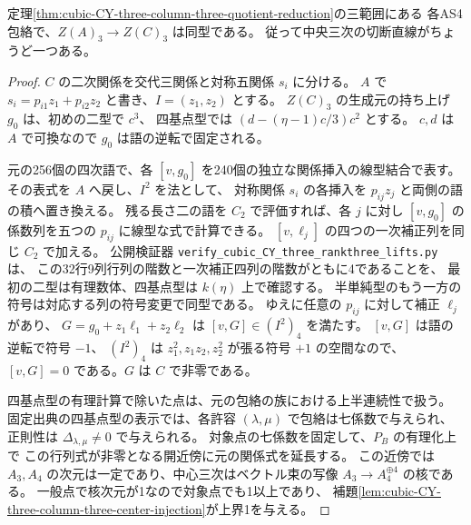 \begin{proposition}\label{prop:cubic-CY-three-column-three-lifts}
定理\ref{thm:cubic-CY-three-column-three-quotient-reduction}の三範囲にある
各AS4包絡で、$Z(A)_3\to Z(C)_3$ は同型である。
従って中央三次の切断直線がちょうど一つある。
\end{proposition}
\begin{proof}
$C$ の二次関係を交代三関係と対称五関係 $s_i$ に分ける。
$A$ で $s_i=p_{i1}z_1+p_{i2}z_2$ と書き、$I=(z_1,z_2)$ とする。
$Z(C)_3$ の生成元の持ち上げ $g_0$ は、初めの二型で $c^3$、
四基点型では $(d-(\eta-1)c/3)c^2$ とする。
$c,d$ は $A$ で可換なので $g_0$ は語の逆転で固定される。

元の256個の四次語で、各 $[v,g_0]$ を240個の独立な関係挿入の線型結合で表す。
その表式を $A$ へ戻し、$I^2$ を法として、
対称関係 $s_i$ の各挿入を $p_{ij}z_j$ と両側の語の積へ置き換える。
残る長さ二の語を $C_2$ で評価すれば、各 $j$ に対し
$[v,g_0]$ の係数列を五つの $p_{ij}$ に線型な式で計算できる。
$[v,\ell_j]$ の四つの一次補正列を同じ $C_2$ で加える。
公開検証器 \texttt{verify\_cubic\_CY\_three\_rankthree\_lifts.py} は、
この32行9列行列の階数と一次補正四列の階数がともに4であることを、
最初の二型は有理数体、四基点型は $k(\eta)$ 上で確認する。
半単純型のもう一方の符号は対応する列の符号変更で同型である。
ゆえに任意の $p_{ij}$ に対して補正 $\ell_j$ があり、
$G=g_0+z_1\ell_1+z_2\ell_2$ は $[v,G]\in (I^2)_4$ を満たす。
$[v,G]$ は語の逆転で符号 $-1$、
$(I^2)_4$ は $z_1^2,z_1z_2,z_2^2$ が張る符号 $+1$ の空間なので、
$[v,G]=0$ である。$G$ は $C$ で非零である。

四基点型の有理計算で除いた点は、元の包絡の族における上半連続性で扱う。
固定出典\cite{AS4CYpinned}の四基点型の表示では、各許容 $(\lambda,\mu)$
で包絡は七係数で与えられ、正則性は
$\Delta_{\lambda,\mu}\ne0$ で与えられる。
対象点の七係数を固定して、$P_B$ の有理化上で
この行列式が非零となる開近傍に元の関係式を延長する。
この近傍では $A_3,A_4$ の次元は一定であり、中心三次はベクトル束の写像
$A_3\to A_4^{\oplus4}$ の核である。
一般点で核次元が1なので対象点でも1以上であり、
補題\ref{lem:cubic-CY-three-column-three-center-injection}が上界1を与える。
\end{proof}

